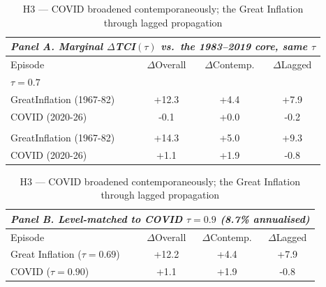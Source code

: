 \begin{table}[!ht]
\centering
\caption{H3 --- COVID broadened contemporaneously; the Great Inflation through lagged propagation}
\label{tab:h3}
\setlength{\tabcolsep}{6pt}\footnotesize
\begin{threeparttable}
\begin{tabular}{l c c c}
\multicolumn{4}{l}{\textit{Panel A. Marginal $\Delta$TCI$(\tau)$ vs.\ the 1983--2019 core, same $\tau$}}\\
\toprule
Episode & $\Delta$Overall & $\Delta$Contemp. & $\Delta$Lagged \\
\midrule
\multicolumn{4}{l}{\textit{\;$\tau=0.7$}}\\
GreatInflation (1967-82) & +12.3 & +4.4 & +7.9 \\
COVID (2020-26) & -0.1 & +0.0 & -0.2 \\
\addlinespace
\multicolumn{4}{l}{\textit{\;$\tau=0.9$}}\\
GreatInflation (1967-82) & +14.3 & +5.0 & +9.3 \\
COVID (2020-26) & +1.1 & +1.9 & -0.8 \\
\bottomrule
\end{tabular}

\vspace{4pt}
\begin{tabular}{l c c c}
\multicolumn{4}{l}{\textit{Panel B. Level-matched to COVID $\tau=0.9$ (8.7\% annualised)}}\\
\toprule
Episode & $\Delta$Overall & $\Delta$Contemp. & $\Delta$Lagged \\
\midrule
Great Inflation ($\tau=0.69$) & +12.2 & +4.4 & +7.9 \\
COVID ($\tau=0.90$) & +1.1 & +1.9 & -0.8 \\
\bottomrule
\end{tabular}


\end{threeparttable}
\end{table}
